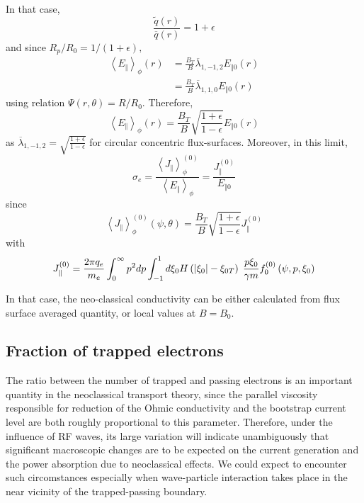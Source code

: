In that case,
\begin{equation}
\frac{\widetilde{q}\left( r\right) }{\overline{q}\left( r\right) }=1+\epsilon
\end{equation}
and since $R_{p}/R_{0}=1/\left( 1+\epsilon\right) ,$%
\begin{align}
\left\langle E_{\Vert}\right\rangle _{\phi}\left( r\right) & =\frac{B_{T}}{B}%
\overline{\lambda}_{1,-1,2}E_{\Vert0}\left( r\right)  \nonumber \\
& =\frac{B_{T}}{B}\overline{\lambda}_{1,1,0}E_{\Vert0}\left( r\right)
\end{align}
using relation $\Psi\left( r,\theta\right) =R/R_{0}.$ Therefore,
\begin{equation}
\left\langle E_{\Vert}\right\rangle _{\phi}\left( r\right) =\frac{B_{T}}{B}%
\sqrt{\frac{1+\epsilon}{1-\epsilon}}E_{\Vert0}\left( r\right)
\end{equation}
as $\overline{\lambda}_{1,-1,2}=\sqrt{\frac{1+\epsilon}{1-\epsilon}}$ for
circular concentric flux-surfaces. Moreover, in this limit,
\begin{equation}
\sigma_{e}=\frac{\left\langle J_{\Vert}\right\rangle _{\phi}^{\left(
0\right) }}{\left\langle E_{\Vert}\right\rangle _{\phi}}=\frac{J_{\Vert
}^{\left( 0\right) }}{E_{\Vert0}}
\end{equation}
since
\begin{equation}
\left\langle J_{\Vert}\right\rangle _{\phi}^{\left( 0\right) }\left(
\psi,\theta\right) =\frac{B_{T}}{B}\sqrt{\frac{1+\epsilon}{1-\epsilon}}
J_{\Vert}^{\left( 0\right) }
\end{equation}
with
\begin{equation}
J_{\Vert}^{\left( 0\right) }=\frac{2\pi q_{e}}{m_{e}}\int_{0}^{%
\infty}p^{2}dp\int_{-1}^{1}d\xi_{0}H\left( \left| \xi_{0}\right|
-\xi_{0T}\right) \;\frac{p\xi_{0}}{\gamma m}f_{0}^{(0)}\left(
\psi,p,\xi_{0}\right)
\end{equation}

In that case, the neo-classical conductivity can be either calculated from
flux surface averaged quantity, or local values at $B=B_{0}$.

\subsection{Fraction of trapped electrons}

The ratio between the number of trapped and passing electrons is an
important quantity in the neoclassical transport theory, since the parallel
viscosity responsible for reduction of the Ohmic conductivity and the
bootstrap current level are both roughly proportional to this parameter.
Therefore, under the influence of RF waves, its large variation will
indicate unambiguously that significant macroscopic changes are to be
expected on the current generation and the power absorption due to
neoclassical effects. We could expect to encounter such circomstances
especially when wave-particle interaction takes place in the near vicinity
of the trapped-passing boundary.

